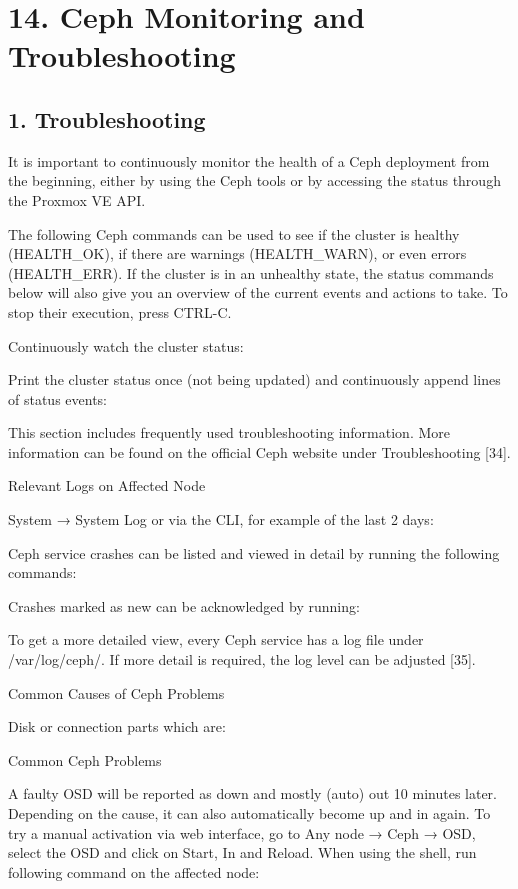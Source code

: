 \section{14. Ceph Monitoring and Troubleshooting}

\subsection{1. Troubleshooting}

It is important to continuously monitor the health of a Ceph deployment from the beginning, either by using the Ceph tools or by accessing the status through the Proxmox VE API.

The following Ceph commands can be used to see if the cluster is healthy (HEALTH_OK), if there are warnings (HEALTH_WARN), or even errors (HEALTH_ERR). If the cluster is in an unhealthy state, the status commands below will also give you an overview of the current events and actions to take. To stop their execution, press CTRL-C.

Continuously watch the cluster status:

Print the cluster status once (not being updated) and continuously append lines of status events:

This section includes frequently used troubleshooting information. More information can be found on the official Ceph website under Troubleshooting [34].

Relevant Logs on Affected Node

System → System Log or via the CLI, for example of the last 2 days:

Ceph service crashes can be listed and viewed in detail by running the following commands:

Crashes marked as new can be acknowledged by running:

To get a more detailed view, every Ceph service has a log file under /var/log/ceph/. If more detail is required, the log level can be adjusted [35].

Common Causes of Ceph Problems

Disk or connection parts which are:

Common Ceph Problems

A faulty OSD will be reported as down and mostly (auto) out 10 minutes later. Depending on the cause, it can also automatically become up and in again. To try a manual activation via web interface, go to Any node → Ceph → OSD, select the OSD and click on Start, In and Reload. When using the shell, run following command on the affected node:


